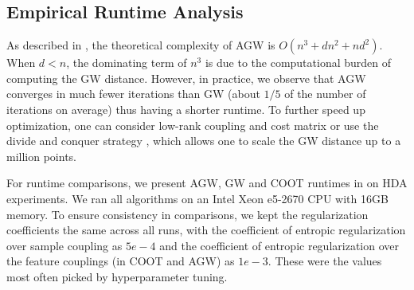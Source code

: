 \subsection{Empirical Runtime Analysis} \label{subsec:chap5_runtime}

As described in ,
the theoretical complexity of AGW is $O(n^3 + dn^2 + nd^2)$. When $d<n$,
the dominating term of $n^3$ is due to the computational burden of computing the GW distance.
However, in practice, we observe that AGW converges in much fewer iterations than GW
(about $1/5$ of the number of iterations on average) thus having a shorter runtime.
To further speed up optimization,
one can consider low-rank coupling and cost matrix \citep{Meyer21b} or
use the divide and conquer strategy \citep{Chowdhury21a},
which allows one to scale the GW distance up to a million points.

For runtime comparisons, we present AGW, GW and COOT runtimes in 
on HDA experiments. We ran all algorithms on an Intel Xeon e5-2670 CPU with 16GB memory.
To ensure consistency in comparisons, we kept the regularization coefficients the same across
all runs, with the coefficient of entropic regularization over sample coupling as $5e-4$ and
the coefficient of entropic regularization over the feature couplings (in COOT and AGW) as $1e-3$.
These were the values most often picked by hyperparameter tuning.


